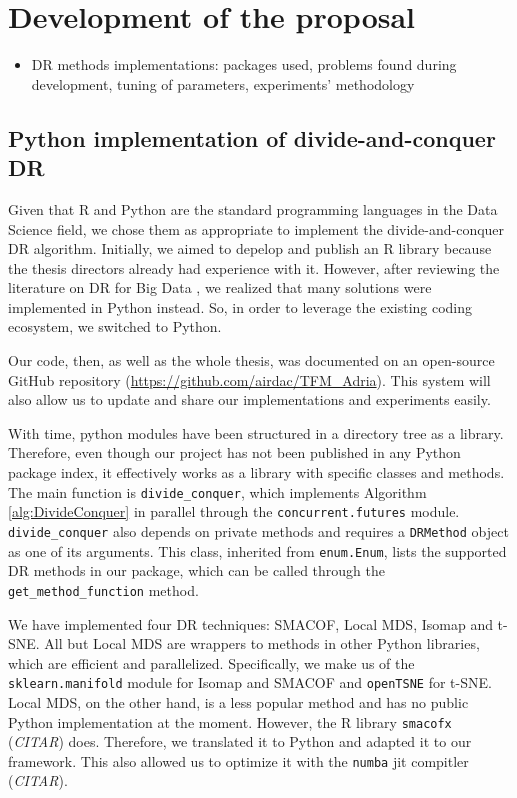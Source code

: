 \section{Development of the proposal}

\begin{itemize}
    \item DR methods implementations: packages used, problems found during development, tuning of parameters, experiments' methodology
\end{itemize}

\subsection{Python implementation of divide-and-conquer DR}

Given that R and Python are the standard programming languages in the Data Science field, we chose them as appropriate to implement the divide-and-conquer  DR algorithm. Initially, we aimed to depelop and publish an R library because the thesis directors already had experience with it. However, after reviewing the literature on DR for Big Data \cite{Reichmann2024}, we realized that many solutions were implemented in Python instead. So, in order to leverage the existing coding ecosystem, we switched to Python.

Our code, then, as well as the whole thesis, was documented on an open-source GitHub repository (\href{https://github.com/airdac/TFM_Adria}{https://github.com/airdac/TFM\_Adria}). This system will also allow us to update and share our implementations and experiments easily.

With time, python modules have been structured in a directory tree as a library. Therefore, even though our project has not been published in any Python package index, it effectively works as a library with specific classes and methods. The main function is \verb|divide_conquer|, which implements Algorithm \ref{alg:DivideConquer} in parallel through the \verb|concurrent.futures| module. \verb|divide_conquer| also depends on private methods and requires a \verb|DRMethod| object as one of its arguments. This class, inherited from \verb|enum.Enum|, lists the supported DR methods in our package, which can be called through the \verb|get_method_function| method.

We have implemented four DR techniques: SMACOF, Local MDS, Isomap and t-SNE. All but Local MDS are wrappers to methods in other Python libraries, which are efficient and parallelized. Specifically, we make us of the \verb|sklearn.manifold| module \cite{Pedregosa2011} for Isomap and SMACOF and \verb|openTSNE| \cite{Poličar2023} for t-SNE. Local MDS, on the other hand, is a less popular method and has no public Python implementation at the moment. However, the R library \verb|smacofx| (\textit{CITAR}) does. Therefore, we translated it to Python and adapted it to our framework. This also allowed us to optimize it with the \verb|numba| jit compitler (\textit{CITAR}).

